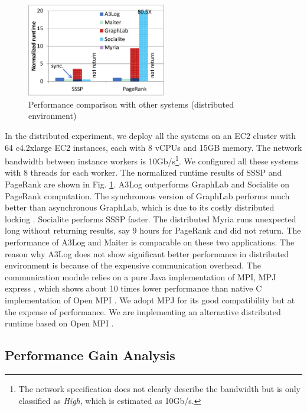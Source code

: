 \begin{figure}[!t]
	\vspace{0.0in}
	\centering
	\includegraphics[width=2.4in]{fig/dist-result}
	\vspace{-0.1in}
	\caption{Performance comparison with other systems (distributed environment)}
	\label{fig:dist-result}
	\vspace{-0.2in}
\end{figure}

In the distributed experiment, we deploy all the systems on an EC2 cluster with 64 c4.2xlarge EC2 instances, each with 8 vCPUs and 15GB memory. The network bandwidth between instance workers is 10Gb/s\footnote{The network specification does not clearly describe the bandwidth but is only classified as \emph{High}, which is estimated as 10Gb/s.}. We configured all these systems with 8 threads for each worker. The normalized runtime results of SSSP and PageRank are shown in Fig. \ref{fig:dist-result}. A3Log outperforms GraphLab and Socialite on PageRank computation. The synchronous version of GraphLab performs much better than asynchronous GraphLab, which is due to its costly distributed locking \cite{Han:2015:GUB:2777598.2777604,Low:2012:DGF:2212351.2212354}. Socialite performs SSSP faster. The distributed Myria runs unexpected long without returning results, say 9 hours for PageRank and did not return. The performance of A3Log and Maiter is comparable on these two applications. The reason why A3Log does not show significant better performance in distributed environment is because of the expensive communication overhead. The communication module relies on a pure Java implementation of MPI, MPJ express \cite{mpich}, which shows about 10 times lower performance than native C implementation of Open MPI \cite{mpjperformance}. We adopt MPJ for its good compatibility but at the expense of performance. We are implementing an alternative distributed runtime based on Open MPI \cite{openmpi}.
\subsection{Performance Gain Analysis}
\label{sec:expr:optimizations}


